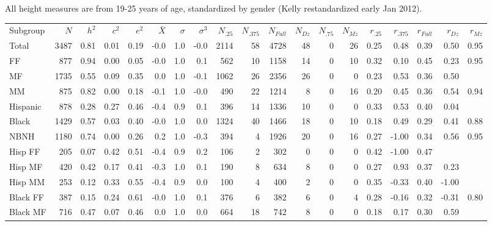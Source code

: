 \documentclass[a4paper]{article}
\begin{document}
All height measures are from 19-25 years of age, standardized by gender (Kelly restandardized early Jan 2012).  
\begin{table}[ht]
\begin{center}
{\footnotesize
\begin{tabular}{lr|rrr|rrr|rrrrrr|rrrrr}
 Subgroup & $N$ & $h^2$ & $c^2$ & $e^2$ & $\bar{X}$ & $\sigma$ & $\sigma^3$ & $N_{.25}$ & $N_{.375}$ & $N_{Full}$ & $N_{Dz}$ & $N_{.75}$ & $N_{Mz}$ & $r_{.25}$ & $r_{.375}$ & $r_{Full}$ & $r_{Dz}$ & $r_{Mz}$ \\ 
 Total & 3487 & 0.81 & 0.01 & 0.19 & -0.0 & 1.0 & -0.0 & 2114 & 58 & 4728 & 48 & 0 & 26 & 0.25 & 0.48 & 0.39 & 0.50 & 0.95 \\ 
   \hline
FF & 877 & 0.94 & 0.00 & 0.05 & -0.0 & 1.0 & 0.1 & 562 & 10 & 1158 & 14 & 0 & 10 & 0.32 & 0.10 & 0.45 & 0.23 & 0.95 \\ 
  MF & 1735 & 0.55 & 0.09 & 0.35 & 0.0 & 1.0 & -0.1 & 1062 & 26 & 2356 & 26 & 0 & 0 & 0.23 & 0.53 & 0.36 & 0.50 &  \\ 
  MM & 875 & 0.82 & 0.00 & 0.18 & -0.1 & 1.0 & -0.0 & 490 & 22 & 1214 & 8 & 0 & 16 & 0.20 & 0.45 & 0.36 & 0.54 & 0.94 \\ 
   \hline
Hispanic & 878 & 0.28 & 0.27 & 0.46 & -0.4 & 0.9 & 0.1 & 396 & 14 & 1336 & 10 & 0 & 0 & 0.33 & 0.53 & 0.40 & 0.04 &  \\ 
  Black & 1429 & 0.57 & 0.03 & 0.40 & -0.0 & 1.0 & 0.0 & 1324 & 40 & 1466 & 18 & 0 & 10 & 0.18 & 0.49 & 0.29 & 0.41 & 0.88 \\ 
  NBNH & 1180 & 0.74 & 0.00 & 0.26 & 0.2 & 1.0 & -0.3 & 394 & 4 & 1926 & 20 & 0 & 16 & 0.27 & -1.00 & 0.34 & 0.56 & 0.95 \\ 
   \hline
Hisp FF & 205 & 0.07 & 0.42 & 0.51 & -0.4 & 0.9 & 0.2 & 106 & 2 & 302 & 0 & 0 & 0 & 0.42 & -1.00 & 0.47 &  &  \\ 
  Hisp MF & 420 & 0.42 & 0.17 & 0.41 & -0.3 & 1.0 & 0.1 & 190 & 8 & 634 & 8 & 0 & 0 & 0.27 & 0.93 & 0.37 & 0.23 &  \\ 
  Hisp MM & 253 & 0.12 & 0.33 & 0.55 & -0.4 & 0.9 & 0.0 & 100 & 4 & 400 & 2 & 0 & 0 & 0.35 & -0.33 & 0.40 & -1.00 &  \\ 
   \hline
Black FF & 387 & 0.15 & 0.24 & 0.61 & -0.0 & 1.0 & 0.1 & 376 & 6 & 382 & 6 & 0 & 4 & 0.28 & -0.16 & 0.32 & -0.31 & 0.80 \\ 
  Black MF & 716 & 0.47 & 0.07 & 0.46 & 0.0 & 1.0 & 0.0 & 664 & 18 & 742 & 8 & 0 & 0 & 0.18 & 0.17 & 0.30 & 0.59 &  \\ 

\end{tabular}}
\end{center}
\end{table}
\end{document}

